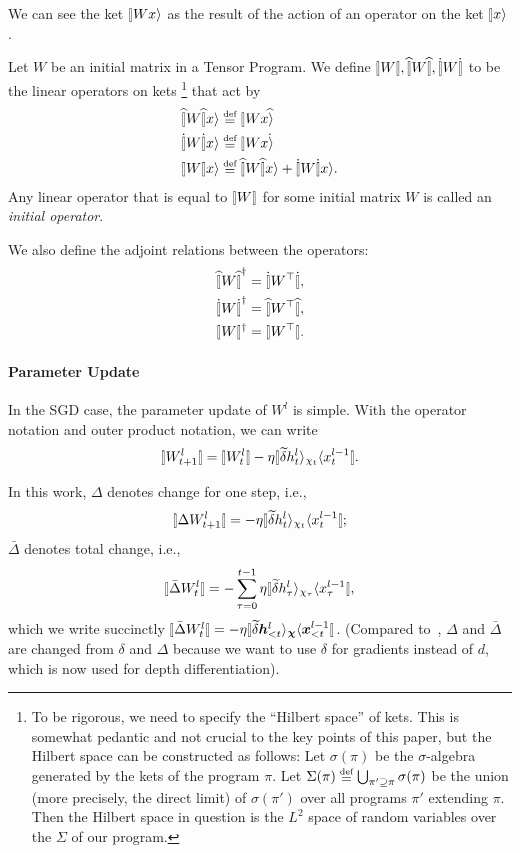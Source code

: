 \documentclass{article}
\theoremstyle{plain}
\theoremstyle{definition}
\begin{document}
We can see the ket $\ket{W x}$ as the result of the action of an operator on the ket $\ket{x}$.
\begin{defn}\label{defn:oplim}
  Let $W$ be an initial matrix in a Tensor Program.
  We define $\oplim{W}, \hatoplim{W}, \dotoplim{W}$ to be the linear operators on kets
  \footnote{\label{footnote:hilbertspace}
    To be rigorous, we need to specify the ``Hilbert space'' of kets.
    This is somewhat pedantic and not crucial to the key points of this paper, but the Hilbert space can be constructed as follows:
    Let $\sigma(\pi)$ be the $\sigma$-algebra generated by the kets of the program $\pi$.
    Let $\Sigma(\pi) \defeq \bigcup_{\pi' \supseteq \pi} \sigma(\pi)$ be the union (more precisely, the direct limit) of $\sigma(\pi')$ over all programs $\pi'$ extending $\pi$.
    Then the Hilbert space in question is the $L^2$ space of random variables over the $\Sigma$ of our program.
    }
  that act by 
  \begin{align*}
      \hatoplim{W} x \ra &\defeq \hatket{Wx}\\
      \dotoplim{W} x \ra &\defeq \dotket{Wx}\\
      \opket{W} x &\defeq \hatoplim{W} x \ra + \dotoplim{W} x \ra.
  \end{align*}
  Any linear operator that is equal to $\oplim{W}$ for some initial matrix $W$ is called an \emph{initial operator}.
\end{defn}

We also define the adjoint relations between the operators:
\begin{align*}
    \hatoplim{W}^\dagger &= \dotoplim{W^\trsp},\\
    \dotoplim{W}^\dagger &= \hatoplim{W^\trsp},\\
    \oplim{W}^\dagger &= \oplim{W^\trsp}.
\end{align*}

\paragraph{Parameter Update}

In the SGD case, the parameter update of $W^l$ is simple. With the operator notation and outer product notation, we can write
\[\oplim{W_{t+1}^l}=\oplim{W_t^l}-\eta \ketdbra{\tilde \del h^l_t}{\chi_t}{x^{l-1}_t}. \]

In this work, $\Delta$ denotes change for one step, i.e., \[\oplim{\Delta W_{t+1}^l}=-\eta \ketdbra{\tilde \del h^l_t}{\chi_t}{x^{l-1}_t};\] $\bar \Delta$ denotes total change, i.e., \[
\oplim{\bar \Delta W_t^l} =-\sum_{\tau=0}^{t-1}\eta \ketdbra{\tilde \del h^l_\tau}{\chi_\tau}{x^{l-1}_\tau}, 
\] which we write succinctly $\oplim{\bar \Delta W_t^l}=-\eta \ketdbra{\tilde \del \hh^l_{<t}}{\cchi}{\xx^{l-1}_{<t}}$. (Compared to~\citet{yang2023tensor}, $\Delta$ and $\bar\Delta$ are changed from $\delta$ and $\Delta$ because we want to use $\delta$ for gradients instead of $d$, which is now used for depth differentiation).
\end{document}
